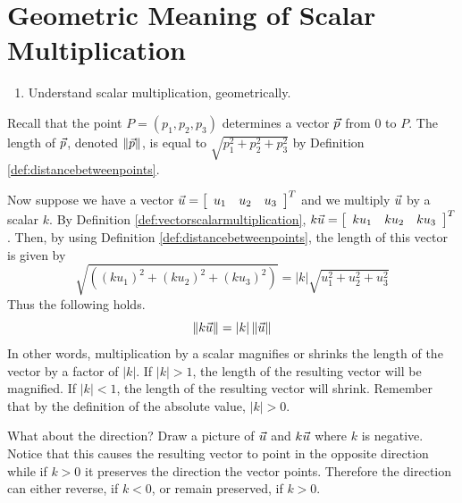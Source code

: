 \section{Geometric Meaning of Scalar Multiplication}

\begin{outcome}

\begin{enumerate}

\item[A.] Understand scalar multiplication, geometrically.

\end{enumerate}
\end{outcome}

Recall that the point $P=\left( p_{1},p_{2},p_{3}\right) $ determines
a vector $\vec{p}$ from $0$ to $P$. The length of $\vec{p}$, denoted $\|
\vec{p} \| $, is equal to $
\sqrt{p_{1}^{2}+p_{2}^{2}+p_{3}^{2}}$ by Definition \ref{def:distancebetweenpoints}.  

Now suppose we have a vector $\vec{u} = \left[ 
\begin{array}{lll}
u_1 &  u_2 & u_3 
\end{array}
\right]^T$ and we multiply $\vec{u}$ by a
scalar $k$. By Definition \ref{def:vectorscalarmultiplication},
$k\vec{u} = \left[
\begin{array}{rrr}
ku_{1} & ku_{2} & ku_{3}
\end{array}
\right]^T $. 
Then, by using Definition \ref{def:distancebetweenpoints}, the length of this vector is given by 
\begin{equation*}
\sqrt{\left( \left( k u_{1}\right) ^{2}+\left( k u_{2}\right)
^{2}+\left( k u_{3}\right) ^{2}\right) }=\left\vert k \right\vert
\sqrt{u_{1}^{2}+u_{2}^{2}+u_{3}^{2}}
\end{equation*}
Thus the following holds.
\begin{equation*}
\| k \vec{u} \| =\left\vert k \right\vert
\| \vec{u} \| 
\end{equation*}
In other words, multiplication by a scalar magnifies or shrinks the length
of the vector by a factor of $\left\vert k \right\vert$. If $\left\vert k \right\vert > 1$, the length of the resulting vector will 
be magnified. If $\left\vert k \right\vert <1$, the length of the resulting vector will shrink. Remember that by the definition 
of the absolute value, $\left\vert k \right\vert >0$. 

What about the direction? Draw a picture of $\vec{u}$ and $k\vec{u}$
where $k$ is negative. Notice that this causes the resulting vector
to point in the opposite direction while if $k >0$ it preserves the
direction the vector points. Therefore the direction can either
reverse, if $k < 0$, or remain preserved, if $k > 0$.

